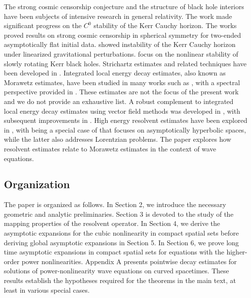 \documentclass[10pt,a4paper,reqno]{amsart}
\theoremstyle{definition}
\theoremstyle{remark}
\numberwithin{equation}{section}
\begin{document}
The strong cosmic censorship conjecture and the structure of black hole interiors have been subjects of intensive research in general relativity. The work \cite{DafermosLuk2017} made significant progress on the $C^0$ stability of the Kerr Cauchy horizon. The works \cite{Luk2019a,Luk2019b} proved results on strong cosmic censorship in spherical symmetry for two-ended asymptotically flat initial data.  \cite{Sbierski2023} showed instability of the Kerr Cauchy horizon under linearized gravitational perturbations. \cite{Giorgi2022a,KS1} focus on the nonlinear stability of slowly rotating Kerr black holes. 
Strichartz estimates and related techniques have been developed in \cite{MarzuolaMetcalfeTataruTohaneanu2010,TohaneanuKerrStrichartz,SmSo}. Integrated local energy decay estimates, also known as Morawetz estimates, have been studied in many works such as \cite{MST,MT}, with a spectral perspective provided in \cite{VasyWunschMorawetz}.  These estimates are not the focus of the present work and we do not provide an exhaustive list. A robust complement to integrated local energy decay estimates using vector field methods was developed in \cite{DR rp}, with subsequent improvements in \cite{Mos16}. High energy resolvent estimates have been explored in \cite{VasyZworskiSmcl,Vasy2011,VasyMicroKerrdS}, with \cite{Vasy2011} being a special case of \cite{VasyMicroKerrdS} that focuses on asymptotically hyperbolic spaces, while the latter also addresses Lorentzian problems. The paper \cite{Looi2025} explores how resolvent estimates relate to Morawetz estimates in the context of wave equations.

\subsection{Organization} The paper is organized as follows. In Section 2, we introduce the necessary geometric and analytic preliminaries. Section 3 is devoted to the study of the mapping properties of the resolvent operator. In Section 4, we derive the asymptotic expansions for the cubic nonlinearity in compact spatial sets before deriving global asymptotic expansions in Section 5. In Section 6, we prove long time asymptotic expansions in compact spatial sets for equations with the higher-order power nonlinearities. Appendix A presents pointwise decay estimates for solutions of power-nonlinearity wave equations on curved spacetimes. These results establish the hypotheses required for the theorems in the main text, at least in various special cases.  %
\end{document}
